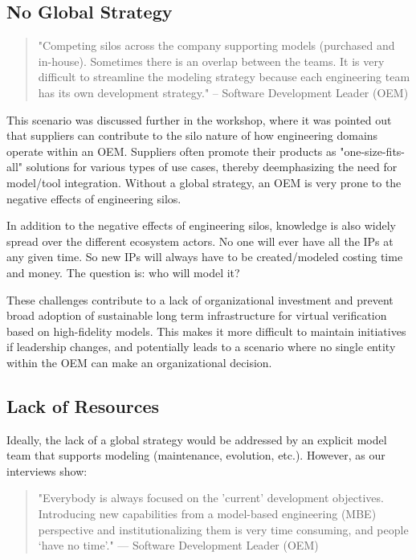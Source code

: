 \subsection{No Global Strategy}
\begin{quote}
"Competing silos across the company supporting models (purchased and in-house).
Sometimes there is an overlap between the teams.
It is very difficult to streamline the modeling strategy because each engineering team has its own development strategy."
-- Software Development Leader (OEM)
\end{quote}

This scenario was discussed further in the workshop, where it was pointed out that suppliers can contribute to the silo nature of how engineering domains operate within an OEM. Suppliers often promote their products as "one-size-fits-all" solutions for various types of use cases, thereby deemphasizing the need for model/tool integration.  Without a global strategy, an OEM is very prone to the negative effects of engineering silos.

In addition to the negative effects of engineering silos, knowledge is also widely spread over the different ecosystem actors.
No one will ever have all the IPs at any given time. So new IPs will always have to be created/modeled costing time and money. The question is: who will model it?

These challenges contribute to a lack of organizational investment and prevent broad adoption of sustainable long term infrastructure for virtual verification based on high-fidelity models.
This makes it more difficult to maintain initiatives if leadership changes, and potentially leads to a scenario where no single entity within the OEM can make an organizational decision.

\subsection{Lack of Resources}
Ideally, the lack of a global strategy would be addressed by an explicit model team that supports modeling (maintenance, evolution, etc.). However, as our interviews show:

\begin{quote}
"Everybody is always focused on the 'current' development objectives. Introducing new capabilities from a model-based engineering (MBE) perspective and institutionalizing them is very time consuming, and people ‘have no time’." 
— Software Development Leader (OEM)
\end{quote}

